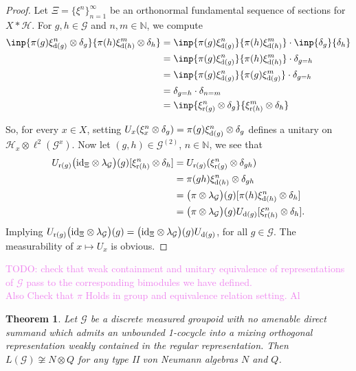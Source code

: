 \documentclass[a4paper,11pt]{article}
\numberwithin{equation}{section}
\newtheorem{thm}{Theorem}[section]
\theoremstyle{definition}
\theoremstyle{remark}
\numberwithin{equation}{section}
\newcommand{\rG}{\mathcal{G}}
\def\N{\mathbb{N}}
\def\H{\mathcal H}
\def\r{{\rm r}}
\def\d{{\rm d}}
\numberwithin{equation}{section}
\begin{document}
\begin{proof}
  Let $ \Xi = \{\xi^{n}\}_{n=1}^{\infty} $ be an orthonormal fundamental sequence of sections for $ X\ast \H $. For $ g,h\in \rG $ and $n, m\in\N $, we compute
  \begin{align*}
    \inp{\pi(g) \xi_{\d(g)}^{n}\otimes \delta_{g}}{\pi(h) \xi_{\d(h)}^{m}\otimes \delta_{h}} &= \inp{\pi(g) \xi_{\d(g)}^{n}}{\pi(h) \xi_{\d(h)}^{m}}\cdot \inp{\delta_{g}}{\delta_{h}}\\
    &= \inp{\pi(g) \xi_{\d(g)}^{n}}{\pi(h) \xi_{\d(h)}^{m}}\cdot \delta_{g=h} \\
    &= \inp{\pi(g) \xi_{\d(g)}^{n}}{\pi(g) \xi_{\d(g)}^{m}}\cdot \delta_{g=h} \\ &=\delta_{g=h}\cdot \delta_{n=m} \\
    &= \inp{\xi_{\r(g)}^{n}\otimes \delta_{g}}{\xi_{\r(h)}^{m}\otimes \delta_{h}}
  \end{align*}

  So, for every $ x\in X $, setting $ U_{x}(\xi_{x}^{n}\otimes \delta_{g}) = \pi(g) \xi_{\d(g)}^{n} \otimes \delta_{g} $ defines a unitary on $ \H_{x}\otimes \ell^{2}(\rG^{x}) $. Now let $(g,h)\in \rG^{(2)}$, $n\in \N$, we see that 
\begin{align*}
    U_{\r(g)}\big({\rm id}_\Xi\otimes \lambda_\rG\big)(g)[\xi_{\r(h)}^n\otimes\delta_h]&=U_{\r(g)}(\xi_{\r(g)}^n\otimes\delta_{gh}) \\
    &=\pi(gh)\xi_{\d(h)}^n\otimes\delta_{gh} \\
    &=\big(\pi\otimes \lambda_\rG\big)(g)[\pi(h)\xi_{\d(h)}^n\otimes\delta_h] \\
    &=\big(\pi\otimes \lambda_\rG\big)(g)U_{\d(g)}[\xi_{\r(h)}^n\otimes\delta_h].
\end{align*} Implying $U_{\r(g)}\big({\rm id}_\Xi\otimes \lambda_\rG\big)(g)=\big({\rm id}_\Xi\otimes \lambda_\rG\big)(g)U_{\d(g)}$, for all $g\in\rG$. The measurability of $x\mapsto U_x$ is obvious. \end{proof}

\textcolor{violet}{TODO: check that weak containment and unitary equivalence of representations of $\rG$ pass to the corresponding bimodules we have defined.\\
Also Check that $\pi$ Holds in group and equivalence relation setting. Al}



\begin{thm}\label{prime}
    Let $\rG$ be a discrete measured groupoid with no amenable direct summand which admits an unbounded 1-cocycle into a mixing orthogonal representation weakly contained in the regular representation. Then $L(\rG) \not \cong N\otimes Q$ for any type II von Neumann algebras $N$ and $Q$. 
\end{thm}
\end{document}
